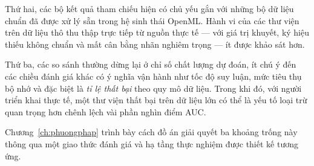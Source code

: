 Thứ hai, các bộ kết quả tham chiếu hiện có chủ yếu gắn với những bộ dữ liệu chuẩn
đã được xử lý sẵn trong hệ sinh thái OpenML. Hành vi của các thư viện trên dữ liệu
thô thu thập trực tiếp từ nguồn thực tế --- với giá trị khuyết, ký hiệu thiếu
không chuẩn và mất cân bằng nhãn nghiêm trọng --- ít được khảo sát hơn.

Thứ ba, các so sánh thường dừng lại ở chỉ số chất lượng dự đoán, ít chú ý đến các
chiều đánh giá khác có ý nghĩa vận hành như tốc độ suy luận, mức tiêu thụ bộ nhớ
và đặc biệt là \emph{tỉ lệ thất bại} theo quy mô dữ liệu. Trong khi đó, với người
triển khai thực tế, một thư viện thất bại trên dữ liệu lớn có thể là yếu tố loại
trừ quan trọng hơn chênh lệch vài phần nghìn điểm AUC.

Chương~\ref{ch:phuongphap} trình bày cách đồ án giải quyết ba khoảng trống này
thông qua một giao thức đánh giá và hạ tầng thực nghiệm được thiết kế tương ứng.
